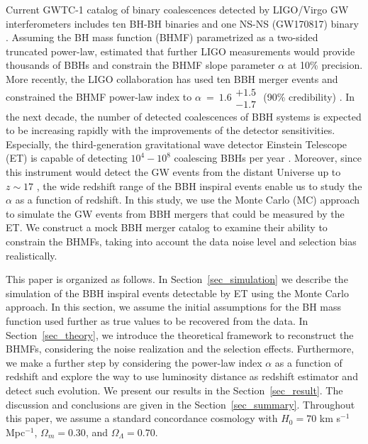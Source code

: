 \documentclass[twocolumn]{aastex62}
\begin{document}
Current GWTC-1 catalog of binary coalescences detected by LIGO/Virgo GW interferometers includes ten BH-BH binaries and one NS-NS (GW170817) binary \citep{Abbott2018}.  Assuming the BH mass function (BHMF) parametrized as a two-sided truncated power-law, \citet{Kovetz2017PhRvD} estimated that further LIGO measurements would provide thousands of BBHs and constrain the BHMF slope parameter $\alpha$ at 10\% precision. More recently, the LIGO collaboration has used ten BBH merger events and constrained the BHMF power-law index to $\alpha~=~1.6\substack{+1.5\\-1.7}$ (90\% credibility) \citep{Abbott2018b}. 
In the next decade, the number of detected coalescences of BBH systems is expected to be increasing rapidly with the improvements of the detector sensitivities. Especially, the third-generation gravitational wave detector Einstein Telescope (ET) is capable of detecting $10^4-10^8$ coalescing BBHs per year \citep{Abernathy2011}. Moreover, since this instrument would detect the GW events from the distant Universe up to $z\sim17$ \citep{Abernathy2011}, the wide redshift range of the BBH inspiral events enable us to study the $\alpha$ as a function of redshift. In this study, we use the Monte Carlo (MC) approach to simulate the GW events from BBH mergers that could be measured by the ET. We construct a mock BBH merger catalog to examine their ability to constrain the BHMFs, taking into account the data noise level and selection bias realistically.

This paper is organized as follows. In Section~\ref{sec_simulation} we describe the simulation of the BBH inspiral events detectable by ET using the Monte Carlo approach. In this section, we assume the initial assumptions for the BH mass function used further as true values to be recovered from the data. In Section~\ref{sec_theory}, we introduce the theoretical framework to reconstruct the BHMFs, considering the noise realization and the selection effects. Furthermore, we make a further step by considering the power-law index $\alpha$ as a function of redshift and explore the way to use luminosity distance as redshift estimator and detect such evolution. We present our results in the Section~\ref{sec_result}. The discussion and conclusions are given in the Section~\ref{sec_summary}. Throughout this paper, we assume a standard concordance cosmology with $H_0= 70$ km s$^{-1}$ Mpc$^{-1}$, $\Omega{_m} = 0.30$, and $\Omega{_\Lambda} = 0.70$.



\vspace{1cm}
\end{document}
